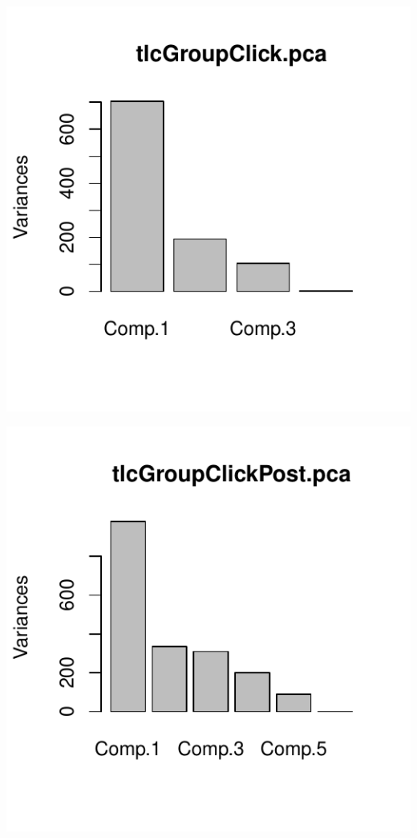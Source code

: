 \documentclass[english]{article}\usepackage[]{graphicx}\usepackage[]{color}
\makeatletter
\def\maxwidth{ %
  \ifdim\Gin@nat@width>\linewidth
    \linewidth
  \else
    \Gin@nat@width
  \fi
}
\newenvironment{knitrout}{}{} %
\makeatother
\begin{document}
\begin{knitrout}
\color{fgcolor}

{\centering \includegraphics[width=\maxwidth]{figure/dataReductionGroupClick-1} 

}



\end{knitrout}


\begin{knitrout}
\color{fgcolor}

{\centering \includegraphics[width=\maxwidth]{figure/dataReductionGroupClickPost-1} 

}



\end{knitrout}
\end{document}
